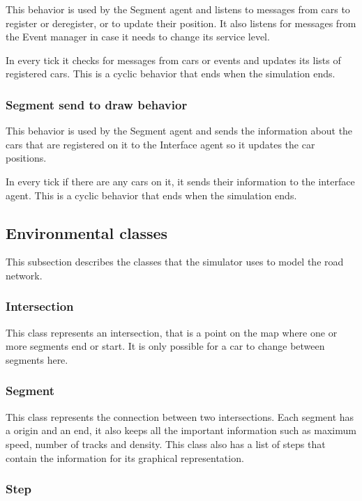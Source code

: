 This behavior is used by the Segment agent and listens to messages from cars to register or deregister, or to update their position. It also listens for messages from the Event manager in case it needs to change its service level.

In every tick it checks for messages from cars or events and updates its lists of registered cars. This is a cyclic behavior that ends when the simulation ends.

\subsubsection{Segment send to draw behavior}

This behavior is used by the Segment agent and sends the information about the cars that are registered on it to the Interface agent so it updates the car positions.

In every tick if there are any cars on it, it sends their information to the interface agent. This is a cyclic behavior that ends when the simulation ends.

\subsection{Environmental classes}

This subsection describes the classes that the simulator uses to model the road network.

\subsubsection{Intersection}

This class represents an intersection, that is a point on the map where one or more segments end or start. It is only possible for a car to change between segments here.

\subsubsection{Segment}

This class represents the connection between two intersections. Each segment has a origin and an end, it also keeps all the important information such as maximum speed, number of tracks and density. This class also has a list of steps that contain the information for its graphical representation.

\subsubsection{Step}

